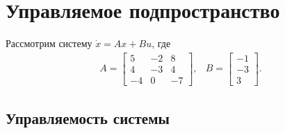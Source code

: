 \section{Управляемое подпространство}

Рассмотрим систему $\dot{x} = Ax + Bu$, где 
\begin{equation}
    \begin{array}{cc}
        A = \begin{bmatrix}
            5 & -2 & 8 \\
            4 & -3 & 4 \\
            -4 & 0 & -7
        \end{bmatrix}, &
        B = \begin{bmatrix}
            -1 \\
            -3 \\
            3
        \end{bmatrix}.
    \end{array}
\end{equation}

\subsection{Управляемость системы}
